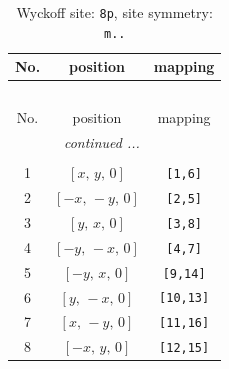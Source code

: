 \documentclass[fleqn,8pt]{jsarticle}
\begin{document}
\renewcommand{\arraystretch}{1.2}
\begin{longtable}{ccc}
\caption{Wyckoff site: {\tt 8p}, site symmetry: {\tt m..}}
 \\
 \hline \hline
No. & position & mapping \\ \hline \endfirsthead

\multicolumn{2}{l}{\tablename\ \thetable{}} \\
 \hline \hline
No. & position & mapping \\ \hline \endhead

 \hline \hline
\multicolumn{2}{r}{\footnotesize\it continued ...} \\ \endfoot

 \hline \hline
\multicolumn{2}{r}{} \\ \endlastfoot

1 & $\left[ x,\, y,\, 0 \right]$ & {\tt [1,6]} \\ \hline
2 & $\left[ - x,\, - y,\, 0 \right]$ & {\tt [2,5]} \\ \hline
3 & $\left[ y,\, x,\, 0 \right]$ & {\tt [3,8]} \\ \hline
4 & $\left[ - y,\, - x,\, 0 \right]$ & {\tt [4,7]} \\ \hline
5 & $\left[ - y,\, x,\, 0 \right]$ & {\tt [9,14]} \\ \hline
6 & $\left[ y,\, - x,\, 0 \right]$ & {\tt [10,13]} \\ \hline
7 & $\left[ x,\, - y,\, 0 \right]$ & {\tt [11,16]} \\ \hline
8 & $\left[ - x,\, y,\, 0 \right]$ & {\tt [12,15]} \\
\end{longtable}
\renewcommand{\arraystretch}{1.2}
\end{document}
